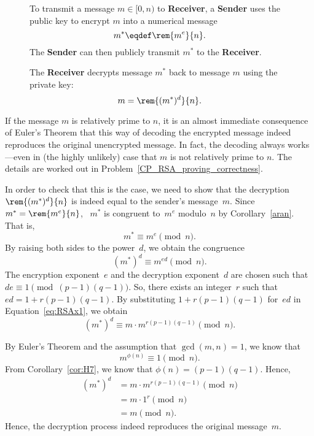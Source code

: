 \begin{figure}[p]
{\begin{minipage}{\textwidth}
\begin{description}
To transmit a message $m \in [0,n)$ to \textbf{Receiver}, a \textbf{Sender} uses the public
  key to encrypt $m$ into a numerical message
\[
m^* \eqdef \rem{m^e}{n}.
\]
The \textbf{Sender} can then publicly transmit $m^*$ to the \textbf{Receiver}.

\item[Decoding] The \textbf{Receiver} decrypts message $m^*$ back to message $m$ using the
  private key:
\[
m = \rem{(m^*)^d}{n}.
\]

\end{description}

\end{minipage}
}
\end{figure}

If the message $m$ is relatively prime to $n$, it is an almost immediate consequence of
Euler's Theorem that this way of decoding the encrypted message indeed reproduces the
original unencrypted message.  In fact, the decoding always works ---even in (the highly
unlikely) case that $m$ is not relatively prime to $n$.  The details are worked out in
Problem~\ref{CP_RSA_proving_correctness}.

\begin{editingnotes}
In order to check that this is the case, we need to show that the decryption
$\rem{(m^*)^d}{n}$ is indeed equal to the sender's message~$m$.  Since $m^* =
\rem{m^e}{n}$, \ $m^*$ is congruent to~$m^e$ modulo~$n$ by Corollary~\ref{aran}.  That is,
\begin{equation*}
    m^* \equiv m^e \pmod n.
\end{equation*}
By raising both sides to the power~$d$, we obtain the congruence
\begin{equation}\label{eq:RSAx1}
    (m^*)^d \equiv m^{ed} \pmod n.
\end{equation}
The encryption exponent~$e$ and the decryption exponent~$d$ are chosen such that $de \equiv
1 \pmod{(p - 1)(q - 1)}$.  So, there exists an integer~$r$ such that $ed = 1 + r(p - 1)(q -
1)$.  By substituting $1 + r(p - 1)(q - 1)$ for~$ed$ in Equation~\ref{eq:RSAx1}, we obtain
\begin{equation}\label{eq:RSAx2}
    (m^*)^d \equiv m \cdot m^{r(p - 1)(q - 1)} \pmod n.
\end{equation}

By Euler's Theorem and the assumption that $\gcd(m, n) = 1$, we know that
\begin{equation*}
    m^{\phi(n)} \equiv 1 \pmod n.
\end{equation*}
From Corollary~\ref{cor:H7}, we know that $\phi(n) = (p - 1)(q - 1)$.  Hence,
\begin{align*}
(m^*)^d &= m \cdot m^{r(p-1)(q-1)} \pmod{n} \\ &= m \cdot 1^{r} \pmod{n} \\ &= m \pmod{n}.
\end{align*}
Hence, the decryption process indeed reproduces the original message~$m$.
\end{editingnotes}

